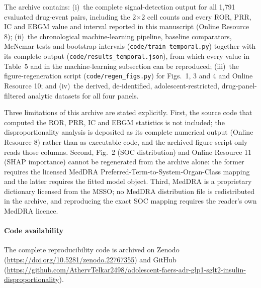 \documentclass[10pt,a4paper]{article}
\begin{document}
The archive contains: (i)~the complete signal-detection output for all 1,791 evaluated drug-event pairs, including the 2$\times$2 cell counts and every ROR, PRR, IC and EBGM value and interval reported in this manuscript (Online Resource 8); (ii)~the chronological machine-learning pipeline, baseline comparators, McNemar tests and bootstrap intervals (\texttt{code/train\_temporal.py}) together with its complete output (\texttt{code/results\_temporal.json}), from which every value in Table~5 and in the machine-learning subsection can be reproduced; (iii)~the figure-regeneration script (\texttt{code/regen\_figs.py}) for Figs.~1, 3 and 4 and Online Resource 10; and (iv)~the derived, de-identified, adolescent-restricted, drug-panel-filtered analytic datasets for all four panels.

Three limitations of this archive are stated explicitly. First, the source code that computed the ROR, PRR, IC and EBGM statistics is not included; the disproportionality analysis is deposited as its complete numerical output (Online Resource 8) rather than as executable code, and the archived figure script only reads those columns. Second, Fig.~2 (SOC distribution) and Online Resource 11 (SHAP importance) cannot be regenerated from the archive alone: the former requires the licensed MedDRA Preferred-Term-to-System-Organ-Class mapping and the latter requires the fitted model object. Third, MedDRA is a proprietary dictionary licensed from the MSSO; no MedDRA distribution file is redistributed in the archive, and reproducing the exact SOC mapping requires the reader's own MedDRA licence.

\paragraph*{Code availability} The complete reproducibility code is archived on Zenodo (\url{https://doi.org/10.5281/zenodo.22767355}) and GitHub (\url{https://github.com/AthervTelkar2498/adolescent-faers-adr-glp1-sglt2-insulin-disproportionality}).
\end{document}
